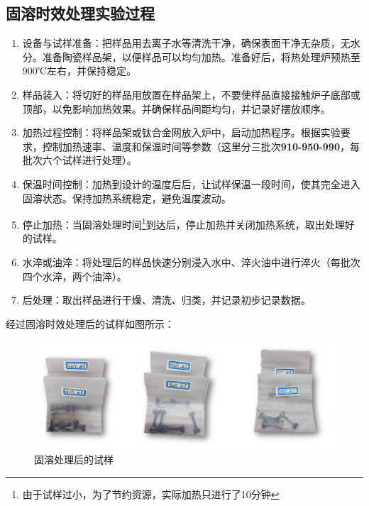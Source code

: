

\subsection{固溶时效处理实验过程}
\begin{enumerate}
	\item 设备与试样准备：把样品用去离子水等清洗干净，确保表面干净无杂质，无水分。准备陶瓷样品架，以便样品可以均匀加热。准备好后，将热处理炉预热至900℃左右，并保持稳定。
	\item 样品装入：将切好的样品用放置在样品架上，不要使样品直接接触炉子底部或顶部，以免影响加热效果。并确保样品间距均匀，并记录好摆放顺序。
	\item 加热过程控制：将样品架或钛合金网放入炉中，启动加热程序。根据实验要求，控制加热速率、温度和保温时间等参数（这里分三批次\textbf{910-950-990}，每批次六个试样进行处理）。
	\item 保温时间控制：加热到设计的温度后后，让试样保温一段时间，使其完全进入固溶状态。保持加热系统稳定，避免温度波动。
	\item 停止加热：当固溶处理时间{\footnote{由于试样过小，为了节约资源，实际加热只进行了10分钟}}到达后，停止加热并关闭加热系统，取出处理好的试样。
	\item 水淬或油淬：将处理后的样品快速分别浸入水中、淬火油中进行淬火（每批次四个水淬，两个油淬）。
	\item 后处理：取出样品进行干燥、清洗、归类，并记录初步记录数据。
\end{enumerate}
经过固溶时效处理后的试样如图所示：

\begin{figure}[h!]
	\centering
	\includegraphics[width=0.8\linewidth]{pic/固溶处理后的试样}
	\caption{固溶处理后的试样}
	\label{fig: aftergurong}
\end{figure}

